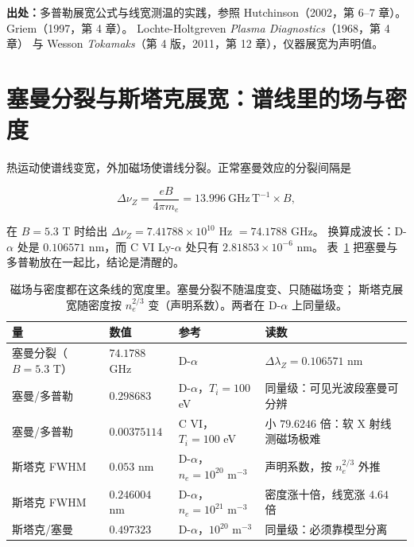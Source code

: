 {\footnotesize
\textbf{出处：}多普勒展宽公式与线宽测温的实践，参照 Hutchinson（2002，第 6--7 章）。
Griem（1997，第 4 章）。
Lochte-Holtgreven \emph{Plasma Diagnostics}（1968，第 4 章）
与 Wesson \emph{Tokamaks}（第 4 版，2011，第 12 章），仪器展宽为声明值。
}

\section{塞曼分裂与斯塔克展宽：谱线里的场与密度}
\label{sec:app-ah-fields}

热运动使谱线变宽，外加磁场使谱线分裂。正常塞曼效应的分裂间隔是

\begin{equation}
\Delta\nu_Z = \frac{eB}{4\pi m_e} = 13.996\ \mathrm{GHz\,T^{-1}}\times B,
\label{eq:app-ah-zeeman}
\end{equation}

在 $B=5.3$ T 时给出 $\Delta\nu_Z = 7.41788\times10^{10}$ Hz $=74.1788$ GHz。
换算成波长：D-$\alpha$ 处是 $0.106571$ nm，而 C VI Ly-$\alpha$ 处只有 $2.81853\times10^{-6}$ nm。
表~\ref{tab:app-ah-fields} 把塞曼与多普勒放在一起比，结论是清醒的。

\begin{table}[htbp]
\centering
\small
\caption{磁场与密度都在这条线的宽度里。塞曼分裂不随温度变、只随磁场变；
斯塔克展宽随密度按 $n_e^{2/3}$ 变（声明系数）。两者在 D-$\alpha$ 上同量级。}
\label{tab:app-ah-fields}
\begin{tabular}{p{2.9cm}p{2.4cm}p{2.5cm}p{4.3cm}}
\toprule
量 & 数值 & 参考 & 读数 \\
\midrule
塞曼分裂（$B=5.3$ T） & $74.1788$ GHz & D-$\alpha$ & $\Delta\lambda_Z=0.106571$ nm \\
塞曼/多普勒 & $0.298683$ & D-$\alpha$，$T_i=100$ eV & 同量级：可见光波段塞曼可分辨 \\
塞曼/多普勒 & $0.00375114$ & C VI，$T_i=100$ eV & 小 $79.6246$ 倍：软 X 射线测磁场极难 \\
斯塔克 FWHM & $0.053$ nm & D-$\alpha$，$n_e=10^{20}$ m$^{-3}$ & 声明系数，按 $n_e^{2/3}$ 外推 \\
斯塔克 FWHM & $0.246004$ nm & D-$\alpha$，$n_e=10^{21}$ m$^{-3}$ & 密度涨十倍，线宽涨 $4.64$ 倍 \\
斯塔克/塞曼 & $0.497323$ & D-$\alpha$，$10^{20}$ m$^{-3}$ & 同量级：必须靠模型分离 \\
\bottomrule
\end{tabular}

\end{table}

